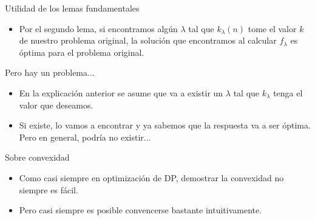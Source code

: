 \documentclass{beamer}
\begin{document}
\begin{frame}{Utilidad de los lemas fundamentales}
    \begin{itemize}
		\item Por el segundo lema, si encontramos algún $\lambda$ tal que $k_\lambda(n)$ tome el valor $k$ de nuestro problema original, la solución que encontramos al calcular $f_\lambda$ es óptima para el problema original.
        \pause
    \end{itemize}
\end{frame}

\begin{frame}{Pero hay un problema...}
    \begin{itemize}
		\item En la explicación anterior se asume que va a existir un $\lambda$ tal que $k_\lambda$ tenga el valor que deseamos.
        \item Si existe, lo vamos a encontrar y ya sabemos que la respuesta va a ser óptima. Pero en general, podría no existir...
        \pause
    \end{itemize}
\end{frame}


\begin{frame}{Sobre convexidad}
    \begin{itemize}
		\item Como casi siempre en optimización de DP, demostrar la convexidad no siempre es fácil.
        \item Pero casi siempre es posible convencerse bastante intuitivamente. 
    \end{itemize}
\end{frame}
\end{document}
